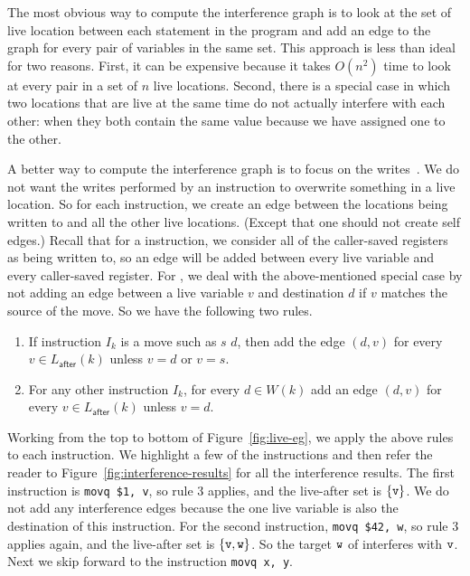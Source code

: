 \documentclass[11pt]{book}
\begin{document}
The most obvious way to compute the interference graph is to look at
the set of live location between each statement in the program and add
an edge to the graph for every pair of variables in the same set.
This approach is less than ideal for two reasons. First, it can be
expensive because it takes $O(n^2)$ time to look at every pair in a
set of $n$ live locations. Second, there is a special case in which
two locations that are live at the same time do not actually interfere
with each other: when they both contain the same value because we have
assigned one to the other.

A better way to compute the interference graph is to focus on the
writes~\cite{Appel:2003fk}. We do not want the writes performed by an
instruction to overwrite something in a live location. So for each
instruction, we create an edge between the locations being written to
and all the other live locations. (Except that one should not create
self edges.)  Recall that for a  instruction, we consider
all of the caller-saved registers as being written to, so an edge will
be added between every live variable and every caller-saved
register. For , we deal with the above-mentioned special
case by not adding an edge between a live variable $v$ and destination
$d$ if $v$ matches the source of the move. So we have the following
two rules.

\begin{enumerate}
\item If instruction $I_k$ is a move such as  $s$\key{,}
  $d$, then add the edge $(d,v)$ for every $v \in
  L_{\mathsf{after}}(k)$ unless $v = d$ or $v = s$.

\item For any other instruction $I_k$, for every $d \in W(k)$
  add an edge $(d,v)$ for every $v \in L_{\mathsf{after}}(k)$ unless $v = d$.
  

\end{enumerate}

Working from the top to bottom of Figure~\ref{fig:live-eg}, we apply
the above rules to each instruction. We highlight a few of the
instructions and then refer the reader to
Figure~\ref{fig:interference-results} for all the interference
results.  The first instruction is \lstinline{movq $1, v}, so rule 3
applies, and the live-after set is $\{\mathtt{v}\}$. We do not add any
interference edges because the one live variable  is also the
destination of this instruction.
%
For the second instruction, \lstinline{movq $42, w}, so rule 3 applies
again, and the live-after set is $\{\mathtt{v},\mathtt{w}\}$. So the target
$\mathtt{w}$ of  interferes with $\mathtt{v}$.
%
Next we skip forward to the instruction \lstinline{movq x, y}.
\end{document}
